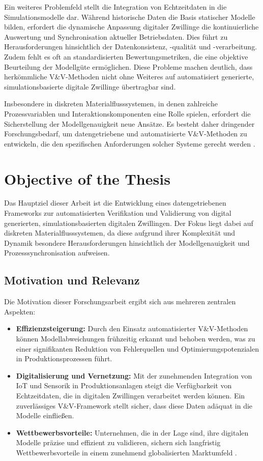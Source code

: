 Ein weiteres Problemfeld stellt die Integration von Echtzeitdaten in die Simulationsmodelle dar. Während historische Daten die Basis statischer Modelle bilden, erfordert die dynamische Anpassung digitaler Zwillinge die kontinuierliche Auswertung und Synchronisation aktueller Betriebsdaten. Dies führt zu Herausforderungen hinsichtlich der Datenkonsistenz, -qualität und -verarbeitung. Zudem fehlt es oft an standardisierten Bewertungsmetriken, die eine objektive Beurteilung der Modellgüte ermöglichen. Diese Probleme machen deutlich, dass herkömmliche V\&V-Methoden nicht ohne Weiteres auf automatisiert generierte, simulationsbasierte digitale Zwillinge übertragbar sind.

Insbesondere in diskreten Materialflusssystemen, in denen zahlreiche Prozessvariablen und Interaktionskomponenten eine Rolle spielen, erfordert die Sicherstellung der Modellgenauigkeit neue Ansätze. Es besteht daher dringender Forschungsbedarf, um datengetriebene und automatisierte V\&V-Methoden zu entwickeln, die den spezifischen Anforderungen solcher Systeme gerecht werden \parencite{Kritzinger2018, Uhlemann2017}.

\section{Objective of the Thesis}

Das Hauptziel dieser Arbeit ist die Entwicklung eines datengetriebenen Frameworks zur automatisierten Verifikation und Validierung von digital generierten, simulationsbasierten digitalen Zwillingen. Der Fokus liegt dabei auf diskreten Materialflusssystemen, da diese aufgrund ihrer Komplexität und Dynamik besondere Herausforderungen hinsichtlich der Modellgenauigkeit und Prozesssynchronisation aufweisen.

\subsection*{Motivation und Relevanz}

Die Motivation dieser Forschungsarbeit ergibt sich aus mehreren zentralen Aspekten:
\begin{itemize}
  \item \textbf{Effizienzsteigerung:} Durch den Einsatz automatisierter V\&V-Methoden können Modellabweichungen frühzeitig erkannt und behoben werden, was zu einer signifikanten Reduktion von Fehlerquellen und Optimierungspotenzialen in Produktionsprozessen führt.
  \item \textbf{Digitalisierung und Vernetzung:} Mit der zunehmenden Integration von IoT und Sensorik in Produktionsanlagen steigt die Verfügbarkeit von Echtzeitdaten, die in digitalen Zwillingen verarbeitet werden können. Ein zuverlässiges V\&V-Framework stellt sicher, dass diese Daten adäquat in die Modelle einfließen.
  \item \textbf{Wettbewerbsvorteile:} Unternehmen, die in der Lage sind, ihre digitalen Modelle präzise und effizient zu validieren, sichern sich langfristig Wettbewerbsvorteile in einem zunehmend globalisierten Marktumfeld \parencite{Grieves2014}.
\end{itemize}

